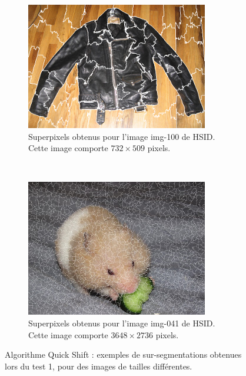  
\begin{figure}[htb]
	\centering
	 \begin{subfigure}[t]{0.6\textwidth}	
			\includegraphics[width=\textwidth]{images/sur-segmentation/QS/Ex1-img-100}
		 	\caption{Superpixels obtenus pour l'image img-100 de HSID. Cette image comporte $732 \times 509$ pixels.}
	\end{subfigure}
 \\
	 \begin{subfigure}[t]{0.6\textwidth}	
			\includegraphics[width=\textwidth]{images/sur-segmentation/QS/Ex2-img-041}
		 	\caption{Superpixels obtenus pour l'image img-041 de HSID. Cette image comporte $3648 \times 2736$ pixels.}
	\end{subfigure}
	\caption{Algorithme Quick Shift : exemples de sur-segmentations obtenues lors du test 1, pour des images de tailles différentes. }
	\label{fig:sp:exqs1}
\end{figure}

